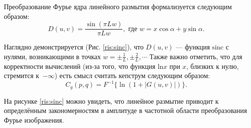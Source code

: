  Преобразование Фурье ядра линейного размытия формализуется следующим образом:
\begin{equation}
D(u, v)=\frac{\sin (\pi L w)}{\pi L w}, \text{ где } w = x \cos \alpha + y \sin \alpha.
\label{motion_blur_fourier}
\end{equation}
\par

Наглядно демонстрируется (Рис. \ref{ris:sinc}), что $D(u,v)$ --- функция $\text {sinc}$ с нулями, возникающими в точках $w=\pm \frac{1}{L}, \pm \frac{2}{L}, \cdots$
Также важно отметить, что для корректности вычислений (из-за того, что функция $\text {ln} x$ 
при $x$, близких к нулю, стремится к~$-\infty$) есть смысл считать кепструм следующим образом:
$$C_{g}(p, q)=F^{-1}\{\ln (1 + |G(u, v)|)\}.$$

На рисунке \ref{ris:sinc} можно увидеть, что линейное размытие приводит к определённым закономерностям в амплитуде в частотной области преобразования Фурье изображения.
\par

